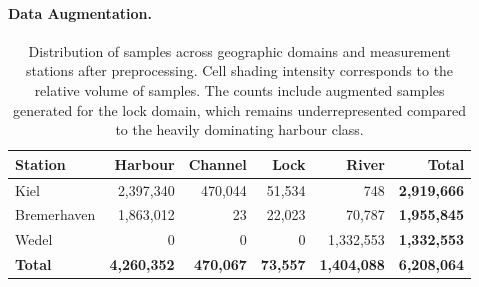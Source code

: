 \paragraph{Data Augmentation.}
\label{subsubsec:augmentation}

\begin{table}[t] 
\centering
\caption[Preprocessed Dataset Domain Distribution]{Distribution of samples across geographic domains and measurement stations after preprocessing. Cell shading intensity corresponds to the relative volume of samples. The counts include augmented samples generated for the lock domain, which remains underrepresented compared to the heavily dominating harbour class.}
\label{tab:trajectory_distribution}
\begin{tabular}{lrrrr|r}
\toprule
\textbf{Station} & \textbf{Harbour} & \textbf{Channel} & \textbf{Lock} & \textbf{River} & \textbf{Total} \\
\midrule
Kiel & \cellcolor{blue!40}2,397,340 & \cellcolor{blue!10}470,044 & \cellcolor{blue!4}51,534 & 748 & \textbf{2,919,666} \\
Bremerhaven & \cellcolor{blue!30}1,863,012 & 23 & \cellcolor{blue!3}22,023 & \cellcolor{blue!5}70,787 & \textbf{1,955,845} \\
Wedel & 0 & 0 & 0 & \cellcolor{blue!20}1,332,553 & \textbf{1,332,553} \\
\midrule
\textbf{Total} & \textbf{4,260,352} & \textbf{470,067} & \textbf{73,557} & \textbf{1,404,088} & \textbf{6,208,064} \\
\bottomrule
\end{tabular}
\end{table}


